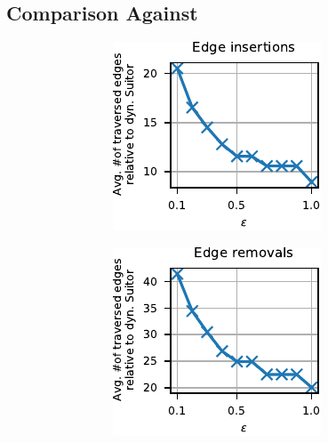 \subsection{Comparison Against \dynmwmrandom}
%
\begin{figure}[t]
\centering
\begin{subfigure}[b]{.5\textwidth}
\begin{subfigure}[b]{.5\textwidth}
\centering
\includegraphics[width=.9\textwidth]{sources/plots/dyn-mwm/rw-insertion-road-vedges.pdf}
\end{subfigure}\hfill
\begin{subfigure}[b]{.5\textwidth}
\centering
\includegraphics[width=.9\textwidth]{sources/plots/dyn-mwm/rw-removal-road-vedges.pdf}

\end{subfigure}
\end{subfigure}
\end{figure}
